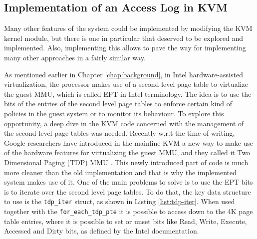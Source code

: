 \subsection{Implementation of an Access Log in KVM}
Many other features of the system could be implemented by modifying the KVM kernel module, but there is one in particular that deserved to be explored and implemented. Also, implementing this allows to pave the way for implementing many other approaches in a fairly similar way. 
\par
As mentioned earlier in Chapter \ref{chap:background}, in Intel hardware-assisted virtualization, the processor makes use of a second level page table to virtualize the guest MMU, which is called EPT in Intel terminology. The idea is to use the bits of the entries of the second level page tables to enforce certain kind of policies in the guest system or to monitor its behaviour. To explore this opportunity, a deep dive in the KVM code concerned with the management of the second level page tables was needed.  Recently w.r.t the time of writing, Google researchers have introduced in the mainline KVM a new way to make use of the hardware features for virtualizing the guest MMU, and they called it Two Dimensional Paging (TDP) MMU \cite{tdp-mmu}. This newly introduced part of code is much more cleaner than the old implementation and that is why the implemented system makes use of it. One of the main problems to solve is to use the EPT bits is to iterate over the second level page tables. To do that, the key data structure to use is the \texttt{tdp\_iter} struct, as shown in Listing \ref{list:tdp-iter}. When used together with the \texttt{for\_each\_tdp\_pte} it is possible to access down to the 4K page table entries, where it is possible to set or unset bits like Read, Write, Execute, Accessed and Dirty bits, as defined by the Intel documentation. 

